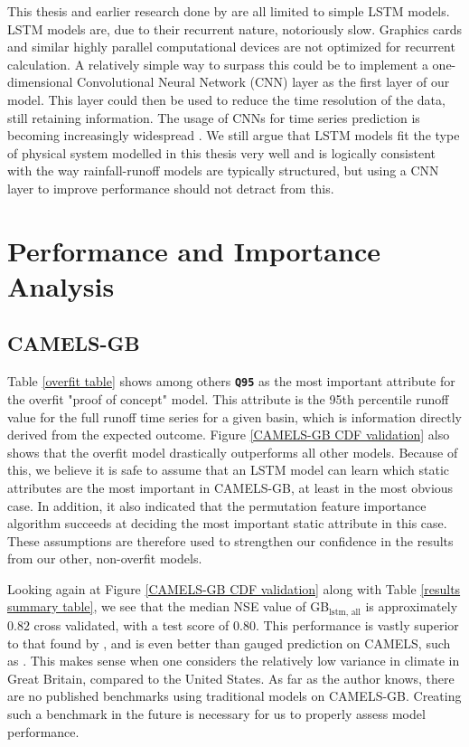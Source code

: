 This thesis and earlier research done by \citet{lstm_first_paper,lstm_second_paper,lstm_third_paper} 
are all limited to simple LSTM models. LSTM models are, due to their recurrent nature, 
notoriously slow. Graphics cards and similar highly parallel computational devices 
are not optimized for recurrent calculation. A relatively 
simple way to surpass this could be to implement a one-dimensional 
Convolutional Neural Network (CNN) layer as the first layer of our model. This 
layer could then be used to reduce the time resolution of the data, still retaining 
information. The usage of CNNs for time series prediction is becoming increasingly
widespread \citep{CNN-timeseries}. We still argue that LSTM models fit the type of
physical system modelled in this thesis very well and is logically consistent 
with the way rainfall-runoff 
models are typically structured, but using a CNN layer to improve performance 
should not detract from this.

\section{Performance and Importance Analysis}
\label{discuss static attributes}
\subsection{CAMELS-GB}
Table \ref{overfit table} shows among others \textbf{\texttt{Q95}} as the most 
important attribute for the overfit "proof of concept" model. This attribute is the 
95th percentile runoff value for the full runoff time series for a given basin, 
which is information directly derived from the expected outcome. 
Figure \ref{CAMELS-GB CDF validation} also shows that the overfit model drastically 
outperforms all other models.
Because of this, we believe it is 
safe to assume that an LSTM model can learn which static attributes are 
the most important in CAMELS-GB, at least in the most obvious case. In addition, 
it also indicated that the permutation feature importance algorithm succeeds at deciding the most important 
static attribute in this case. These assumptions are therefore used to strengthen 
our confidence in the results from our other, non-overfit models. 

Looking again at Figure \ref{CAMELS-GB CDF validation} along with Table 
\ref{results summary table}, we see that the median NSE value of GB$_\text{lstm, all}$ 
is approximately $0.82$ cross validated, with a test score of $0.80$. 
This performance is vastly superior to that found by \citet{lstm_third_paper}, and 
is even better than gauged prediction on CAMELS, such as \citet{lstm_second_paper}. 
This makes sense when one considers the relatively low variance in climate in Great 
Britain, compared to the United States. 
As far as the author knows, there are no published benchmarks using traditional models on 
CAMELS-GB. Creating such a benchmark in the future is necessary for us to properly 
assess model performance.

